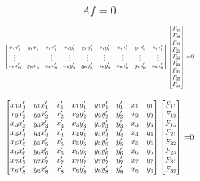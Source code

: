 \documentclass[Conference]{IEEEtran}
\begin{document}
\begin{equation}\label{eq:Af}Af=0\end{equation}

\begin{equation}\label{eq:fullFundamental}
    \resizebox{0.5\textwidth}{!}{
        $\begin{bmatrix}
            x_1x_1' & y_1x_1' & z_1x_1' & x_1y_1' & y_1y_1' & z_1y_1' & x_1z_1' & y_1z_1' & z_1z_1'\\
            \vdots&\vdots&\vdots&\vdots&\vdots&\vdots&\vdots&\vdots&\vdots\\
            x_nx_n' & y_nx_n' & z_nx_n' & x_ny_n' & y_ny_n' & z_ny_n' & x_nz_n' & y_nz_n' & z_nz_n'\\
        \end{bmatrix}
        \begin{bmatrix}
            F_{11}\\F_{12}\\F_{13}\\F_{21}\\F_{22}\\F_{23}\\F_{31}\\F_{32}\\F_{33}
        \end{bmatrix}$
        =0\\
    }
\end{equation}

\begin{equation}\label{eq:expanded8Pt}
    \resizebox{0.5\textwidth}{!}{
        $\begin{bmatrix}
            x_1x_1' & y_1x_1' & x_1' & x_1y_1' & y_1y_1' & y_1' & x_1 & y_1\\
            x_2x_2' & y_2x_2' & x_2' & x_2y_2' & y_2y_2' & y_2' & x_2 & y_2\\
            x_3x_3' & y_3x_3' & x_3' & x_3y_3' & y_3y_3' & y_3' & x_3 & y_3\\
            x_4x_4' & y_4x_4' & x_4' & x_4y_4' & y_4y_4' & y_4' & x_4 & y_4\\
            x_5x_5' & y_5x_5' & x_5' & x_5y_5' & y_5y_5' & y_5' & x_5 & y_5\\
            x_6x_6' & y_6x_6' & x_6' & x_6y_6' & y_6y_6' & y_6' & x_6 & y_6\\
            x_7x_7' & y_7x_7' & x_7' & x_7y_7' & y_7y_7' & y_7' & x_7 & y_7\\
            x_8x_8' & y_8x_8' & x_8' & x_8y_8' & y_8y_8' & y_8' & x_8 & y_8\\
        \end{bmatrix}
        \begin{bmatrix}
            F_{11}\\F_{12}\\F_{13}\\F_{21}\\F_{22}\\F_{23}\\F_{31}\\F_{32}
        \end{bmatrix}$
        =0\\
    }
\end{equation}
\end{document}

